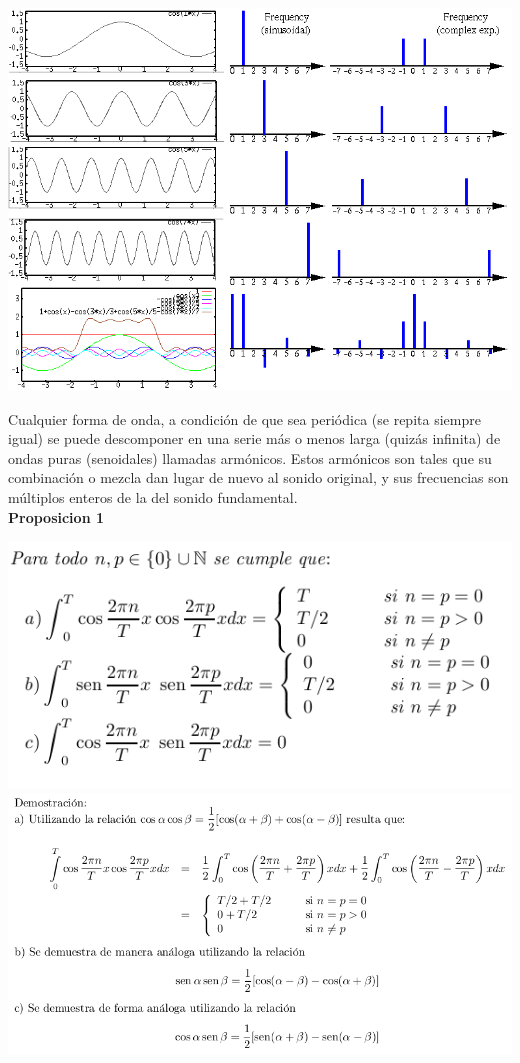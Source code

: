 \documentclass[10pt,a4paper]{book}
\begin{document}
\begin{center}
	\includegraphics[scale=0.45]{AudioFourier.png}\\
\end{center}

Cualquier forma de onda, a condición de que sea periódica (se repita siempre igual) se puede descomponer en una serie más o menos larga (quizás infinita) de ondas puras (senoidales) llamadas armónicos. Estos armónicos son tales que su combinación o mezcla dan lugar de nuevo al sonido original, y sus frecuencias son múltiplos enteros de la del sonido fundamental.\\

\textbf{Proposicion 1}\\

\begin{center}
	\includegraphics[scale=0.45]{AudioFourier2.png}
	\includegraphics[scale=0.45]{AudioFourier3.png}
\end{center}
\end{document}
